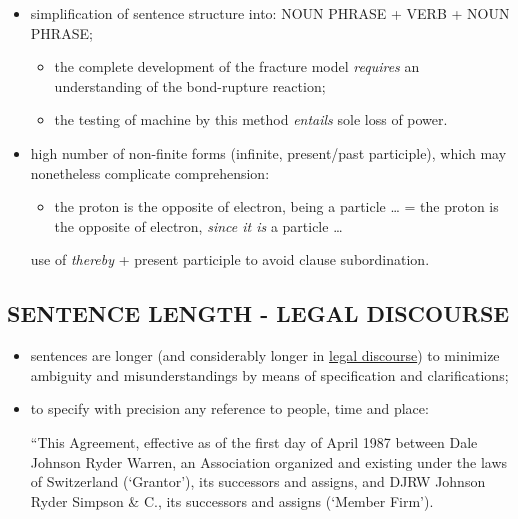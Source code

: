 \begin{itemize}

\item simplification of sentence structure into: NOUN PHRASE + VERB + NOUN PHRASE;

\begin{itemize}

\item the complete development of the fracture model \textit{requires} an understanding of the bond-rupture reaction;
\item  the testing of machine by this method \textit{entails} sole loss of power.

\end{itemize}

\item  high number of non-finite forms (infinite, present/past participle), which may nonetheless complicate comprehension:

\begin{itemize}
\item  the proton is the opposite of electron, being a particle … = the proton is the opposite of electron, \textit{since it is} a particle …
\end{itemize}

use of \textit{thereby} + present participle to avoid clause subordination.
 
\end{itemize}
 
\subsection{SENTENCE LENGTH - LEGAL DISCOURSE}

\begin{itemize}

\item sentences are longer (and considerably longer in \underline{legal discourse}) to minimize ambiguity and misunderstandings by means of specification and clarifications; 
\item to specify with precision any reference to people, time and place:

“This Agreement, effective as of the first day of April 1987 between Dale Johnson Ryder Warren, an Association organized and existing under the laws of Switzerland (‘Grantor’), its successors and assigns, and DJRW Johnson Ryder Simpson \& C., its successors and assigns (‘Member Firm’).

\end{itemize}
 
